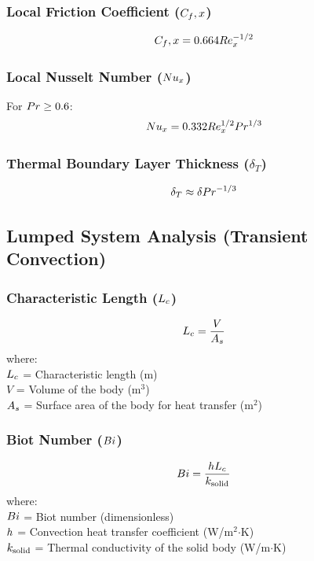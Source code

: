 \subsubsection*{Local Friction Coefficient ($C_f,x$)}
\begin{equation}
    C_f,x = 0.664 Re_x^{-1/2}
\end{equation}

\subsubsection*{Local Nusselt Number ($Nu_x$)}
For $Pr \ge 0.6$:
\begin{equation}
    Nu_x = 0.332 Re_x^{1/2} Pr^{1/3}
\end{equation}

\subsubsection*{Thermal Boundary Layer Thickness ($\delta_T$)}
\begin{equation}
    \delta_T \approx \delta Pr^{-1/3}
\end{equation}

\subsection{Lumped System Analysis (Transient Convection)}
\subsubsection*{Characteristic Length ($L_c$)}
\begin{equation}
    L_c = \frac{V}{A_s}
\end{equation}
where: \\
$L_c$ = Characteristic length (m) \\
$V$ = Volume of the body (m$^3$) \\
$A_s$ = Surface area of the body for heat transfer (m$^2$)

\subsubsection*{Biot Number ($Bi$)}
\begin{equation}
    Bi = \frac{h L_c}{k_{\text{solid}}}
\end{equation}
where: \\
$Bi$ = Biot number (dimensionless) \\
$h$ = Convection heat transfer coefficient (W/m$^2$$\cdot$K) \\
$k_{\text{solid}}$ = Thermal conductivity of the solid body (W/m$\cdot$K)

